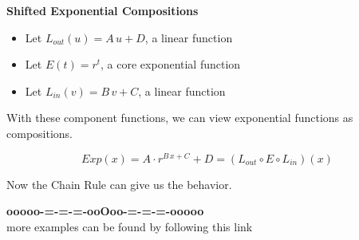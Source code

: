 \documentclass{ximera}
\begin{document}
\begin{idea}  \textbf{\textcolor{blue!55!black}{Shifted Exponential Compositions}} 




\begin{itemize}
\item Let $L_{out}(u) = A \, u + D$, a linear function
\item Let $E(t) = r^t$, a core exponential function
\item Let $L_{in}(v) = B \, v + C$, a linear function
\end{itemize}

With these component functions, we can view exponential functions as compositions.


\[  Exp(x) =    A \cdot r^{B \, x + C} + D= (L_{out} \circ E \circ L_{in})(x) \]


Now the Chain Rule can give us the behavior.

\end{idea}














\begin{center}
\textbf{\textcolor{green!50!black}{ooooo-=-=-=-ooOoo-=-=-=-ooooo}} \\

more examples can be found by following this link\\ 

\end{center}
\end{document}
